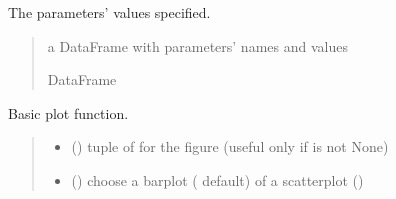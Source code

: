 \documentclass[letterpaper,10pt,english]{sphinxmanual}
\begin{document}
\begin{fulllineitems}
\begin{fulllineitems}
\label{\detokenize{cubmods:cubmods.smry.CUBsample.as_dataframe}}
\pysigstartsignatures
{}
\pysigstopsignatures
\sphinxAtStartPar
The parameters’ values specified.
\begin{quote}\begin{description}
\sphinxAtStartPar
a DataFrame with parameters’ names and values

\sphinxAtStartPar
DataFrame

\end{description}\end{quote}

\end{fulllineitems}


\begin{fulllineitems}
\label{\detokenize{cubmods:cubmods.smry.CUBsample.plot}}
\pysigstartsignatures
{}
\pysigstopsignatures
\sphinxAtStartPar
Basic plot function.
\begin{quote}\begin{description}
\begin{itemize}
\item {} 
\sphinxAtStartPar
{} () \textendash{} tuple of  for the figure (useful only if  is not None)

\item {} 
\sphinxAtStartPar
{} () \textendash{} choose a barplot ( default) of a scatterplot ()


\end{itemize}
\end{description}
\end{quote}
\end{fulllineitems}
\end{fulllineitems}
\end{document}
